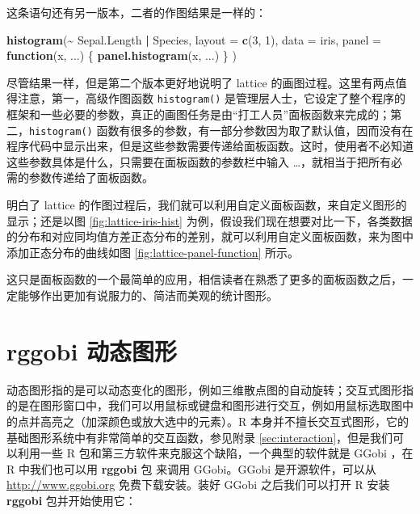 \documentclass[
  b5paper,
  UTF8,twoside]{book}
\newenvironment{Shaded}{\begin{snugshade}}{\end{snugshade}}
\newcommand{\AttributeTok}[1]{\textcolor[rgb]{0.13,0.29,0.53}{#1}}
\newcommand{\ControlFlowTok}[1]{\textcolor[rgb]{0.13,0.29,0.53}{\textbf{#1}}}
\newcommand{\DecValTok}[1]{\textcolor[rgb]{0.00,0.00,0.81}{#1}}
\newcommand{\FunctionTok}[1]{\textcolor[rgb]{0.13,0.29,0.53}{\textbf{#1}}}
\newcommand{\NormalTok}[1]{#1}
\newcommand{\SpecialCharTok}[1]{\textcolor[rgb]{0.81,0.36,0.00}{\textbf{#1}}}
\begin{document}
这条语句还有另一版本，二者的作图结果是一样的：

\begin{Shaded}
\begin{Highlighting}[]
\FunctionTok{histogram}\NormalTok{(}\SpecialCharTok{\textasciitilde{}}\NormalTok{ Sepal.Length }\SpecialCharTok{|}\NormalTok{ Species,}
  \AttributeTok{layout =} \FunctionTok{c}\NormalTok{(}\DecValTok{3}\NormalTok{, }\DecValTok{1}\NormalTok{), }\AttributeTok{data =}\NormalTok{ iris,}
  \AttributeTok{panel =} \ControlFlowTok{function}\NormalTok{(x, ...) \{}
    \FunctionTok{panel.histogram}\NormalTok{(x, ...)}
\NormalTok{  \}}
\NormalTok{)}
\end{Highlighting}
\end{Shaded}

尽管结果一样，但是第二个版本更好地说明了 lattice 的画图过程。这里有两点值得注意，第一，高级作图函数 \texttt{histogram()} 是管理层人士，它设定了整个程序的框架和一些必要的参数，真正的画图任务是由``打工人员''面板函数来完成的；第二，\texttt{histogram()} 函数有很多的参数，有一部分参数因为取了默认值，因而没有在程序代码中显示出来，但是这些参数需要传递给面板函数。这时，使用者不必知道这些参数具体是什么，只需要在面板函数的参数栏中输入 \ldots，就相当于把所有必需的参数传递给了面板函数。

明白了 lattice 的作图过程后，我们就可以利用自定义面板函数，来自定义图形的显示；还是以图 \ref{fig:lattice-iris-hist} 为例，假设我们现在想要对比一下，各类数据的分布和对应同均值方差正态分布的差别，就可以利用自定义面板函数，来为图中添加正态分布的曲线如图 \ref{fig:lattice-panel-function} 所示。

这只是面板函数的一个最简单的应用，相信读者在熟悉了更多的面板函数之后，一定能够作出更加有说服力的、简洁而美观的统计图形。

\section{rggobi 动态图形}\label{sec:dynamic-graphics}

动态图形指的是可以动态变化的图形，例如三维散点图的自动旋转；交互式图形指的是在图形窗口中，我们可以用鼠标或键盘和图形进行交互，例如用鼠标选取图中的点并高亮之（加深颜色或放大选中的元素）。R 本身并不擅长交互式图形，它的基础图形系统中有非常简单的交互函数，参见附录 \ref{sec:interaction}，但是我们可以利用一些 R 包和第三方软件来克服这个缺陷，一个典型的软件就是 GGobi \citep{Cook07}，在 R 中我们也可以用 \textbf{rggobi} 包 \citep{rggobi} 来调用 GGobi。GGobi 是开源软件，可以从 \url{http://www.ggobi.org} 免费下载安装。装好 GGobi 之后我们可以打开 R 安装 \textbf{rggobi} 包并开始使用它：
\end{document}
